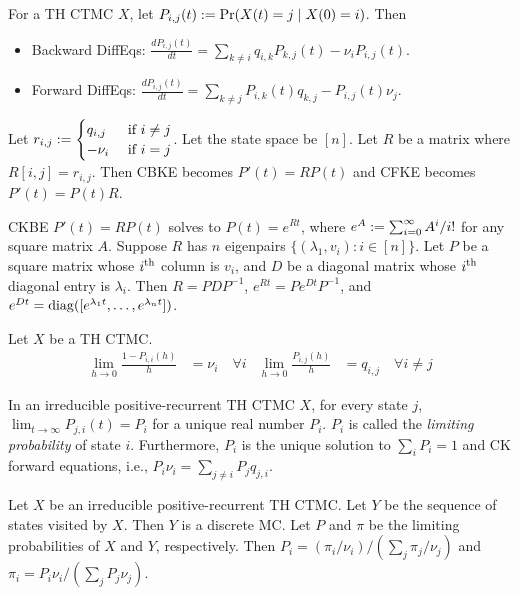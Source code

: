 \documentclass[a4paper, 12pt, fleqn]{article}
\begin{document}
\begin{theorem}
For a TH CTMC $X$, let $P_{i,j}(t) := \Pr(X(t)=j \mid X(0)=i)$. Then
\begin{itemize}
\item Backward DiffEqs: $\displaystyle \frac{dP_{i,j}(t)}{dt} = \sum_{k \neq i} q_{i,k}P_{k,j}(t) - \nu_iP_{i,j}(t)$.
\item Forward DiffEqs: $\displaystyle \frac{dP_{i,j}(t)}{dt} = \sum_{k \neq j} P_{i,k}(t)q_{k,j} - P_{i,j}(t)\nu_j$.  \end{itemize}
Let $r_{i,j} := \begin{cases}q_{i,j} & \textrm{ if } i \neq j \\ -\nu_i & \textrm{ if } i = j\end{cases}$.
Let the state space be $[n]$. Let $R$ be a matrix where $R[i,j] = r_{i,j}$.
Then CBKE becomes $P'(t) = RP(t)$ and CFKE becomes $P'(t) = P(t)R$.
\end{theorem}

\begin{lemma}
CKBE $P'(t) = RP(t)$ solves to $P(t) = e^{Rt}$,
where $e^{A} := \sum_{i=0}^{\infty} A^i/i!$ for any square matrix $A$.
Suppose $R$ has $n$ eigenpairs $\{(\lambda_1, v_i): i \in [n]\}$.
Let $P$ be a square matrix whose $i^{\textrm{th}}$ column is $v_i$,
and $D$ be a diagonal matrix whose $i^{\textrm{th}}$ diagonal entry is $\lambda_i$.
Then $R = PDP^{-1}$, $e^{Rt} = Pe^{Dt}P^{-1}$,
and $e^{Dt} = \operatorname{diag}([e^{\lambda_1t}, \ldots, e^{\lambda_nt}])$.
\end{lemma}

\begin{lemma}
Let $X$ be a TH CTMC.
\begin{align*}
\lim_{h \to 0} \frac{1-P_{i,i}(h)}{h} &= \nu_i\quad\forall i
& \lim_{h \to 0} \frac{P_{i,j}(h)}{h} &= q_{i,j}\quad\forall i \neq j
\end{align*}
\end{lemma}

\begin{lemma}
\label{thm:ctmc:limprob}
In an irreducible positive-recurrent TH CTMC $X$, for every state $j$,
$\lim_{t \to \infty} P_{j,i}(t) = P_i$ for a unique real number $P_i$.
$P_i$ is called the \emph{limiting probability} of state $i$.
Furthermore, $P_i$ is the unique solution to $\sum_i P_i = 1$ and CK forward equations,
i.e., $P_i\nu_i = \sum_{j \neq i} P_jq_{j,i}$.
\end{lemma}

\begin{lemma}
Let $X$ be an irreducible positive-recurrent TH CTMC. Let $Y$ be the sequence of states visited by $X$.
Then $Y$ is a discrete MC. Let $P$ and $\pi$ be the limiting probabilities of $X$ and $Y$, respectively.
Then $P_i = (\pi_i/\nu_i)/(\sum_j \pi_j/\nu_j)$ and $\pi_i = P_i\nu_i/(\sum_j P_j\nu_j)$.
\end{lemma}
\end{document}
